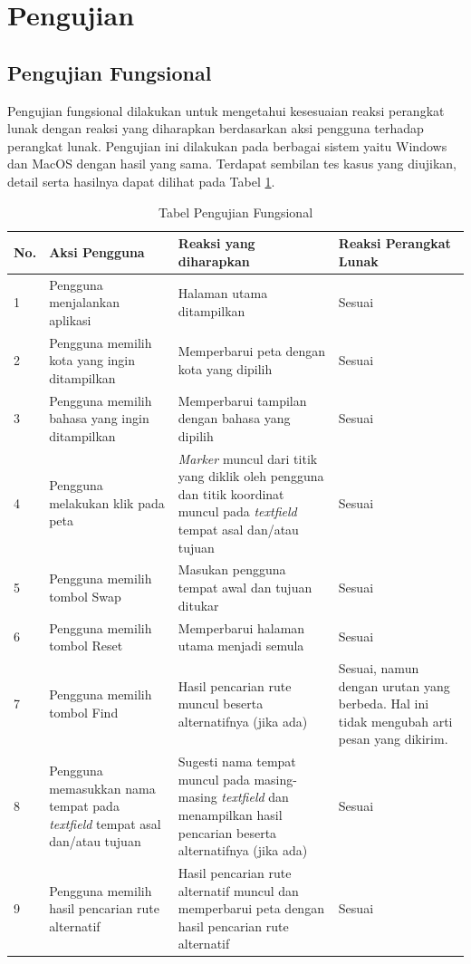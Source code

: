\section{Pengujian}
\subsection{Pengujian Fungsional}

Pengujian fungsional dilakukan untuk mengetahui kesesuaian reaksi perangkat lunak dengan reaksi yang diharapkan berdasarkan aksi pengguna terhadap perangkat lunak. Pengujian ini dilakukan pada berbagai sistem yaitu Windows dan MacOS dengan hasil yang sama. Terdapat sembilan tes kasus yang diujikan, detail serta hasilnya dapat dilihat pada Tabel \ref{table:hasilFungsional}.
			
\begin{table}[H]
	\centering
	\caption{Tabel Pengujian Fungsional}
		\begin{tabular}{|p{0.25cm}| p{3.5cm}| p{7cm}| p{2.5cm}|} \hline
		No.	&	Aksi Pengguna	&	Reaksi yang diharapkan	&	Reaksi Perangkat Lunak \\ \hline
		1 & Pengguna menjalankan aplikasi & Halaman utama ditampilkan & Sesuai \\ \hline
2 & Pengguna memilih kota yang ingin ditampilkan & Memperbarui peta dengan kota yang dipilih & Sesuai \\ \hline
3 & Pengguna memilih bahasa yang ingin ditampilkan & Memperbarui tampilan dengan bahasa yang dipilih & Sesuai \\ \hline
4 & Pengguna melakukan klik pada peta & \textit{Marker} muncul dari titik yang diklik oleh pengguna dan titik koordinat muncul pada \textit{textfield} tempat asal dan/atau tujuan & Sesuai \\ \hline
5 & Pengguna memilih tombol Swap & Masukan pengguna tempat awal dan tujuan ditukar & Sesuai \\ \hline
6 & Pengguna memilih tombol Reset & Memperbarui halaman utama menjadi semula & Sesuai \\ \hline
7 & Pengguna memilih tombol Find & Hasil pencarian rute muncul beserta alternatifnya (jika ada) & Sesuai, namun dengan urutan yang berbeda. Hal ini tidak mengubah arti pesan yang dikirim. \\ \hline
8 & Pengguna memasukkan nama tempat pada \textit{textfield} tempat asal dan/atau tujuan & Sugesti nama tempat muncul pada masing-masing \textit{textfield} dan menampilkan hasil pencarian beserta alternatifnya (jika ada) & Sesuai \\ \hline
9 & Pengguna memilih hasil pencarian rute alternatif & Hasil pencarian rute alternatif muncul dan memperbarui peta dengan hasil pencarian rute alternatif & Sesuai \\ \hline
		
		\end{tabular}
	\label{table:hasilFungsional}
\end{table}


